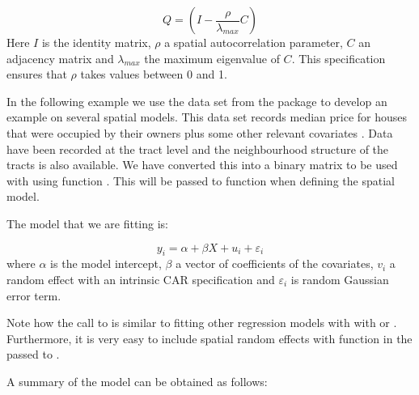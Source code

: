 \documentclass[article]{jss}
\begin{document}
$$
Q = (I - \frac{\rho}{\lambda_{max}}C)
$$
\noindent
Here $I$ is the identity matrix, $\rho$ a spatial autocorrelation parameter,
$C$ an adjacency matrix and $\lambda_{max}$ the maximum eigenvalue of $C$.
This specification ensures that $\rho$ takes values between 0 and 1. 

In the following example we use the  data set from the
 package  to develop an example on several spatial
models.  This data set  records median price for houses that were occupied by
their owners plus some other relevant covariates \citep[see,][for
details]{HarrisonRubinfeld:1978}. Data have been recorded at the tract level
and the neighbourhood structure of the tracts is also available.
We have converted this into a binary matrix to be used with 
using function . This will be passed to function  when
defining the spatial model.

The model that we are fitting is:

$$
y_i = \alpha+\beta X + u_i +\varepsilon_i
$$
\noindent
where $\alpha$ is the model intercept, $\beta$ a vector of coefficients
of the covariates, $v_i$ a random effect with an intrinsic CAR specification
and $\varepsilon_i$ is random Gaussian error term.



\begin{Schunk}
\end{Schunk}

Note how the call to  is similar to fitting other regression
models with  with  or . Furthermore, 
it is very easy to include spatial random effects with function 
in the  passed to .


A summary of the model can be obtained as
follows:
\end{document}
